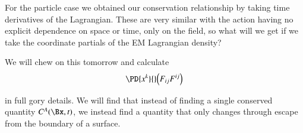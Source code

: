 For the particle case we obtained our conservation relationship by taking time derivatives of the Lagrangian.  These are very similar with the action having no explicit dependence on space or time, only on the field, so what will we get if we take the coordinate partials of the EM Lagrangian density?

We will chew on this tomorrow and calculate
%
\begin{equation}\label{eqn:relativisticElectrodynamicsL21b:540}
\PD{x^k}{} \Bigl( F_{i j} F^{i j} \Bigr)
\end{equation}

in full gory details.  We will find that instead of finding a single conserved quantity \(C^A(\Bx, t)\), we instead find a quantity that only changes through escape from the boundary of a surface.
